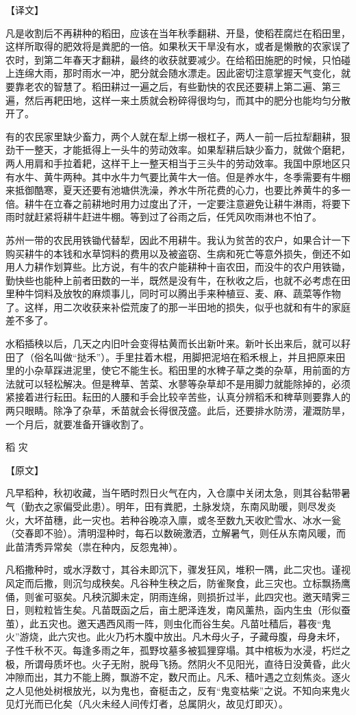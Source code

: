 \documentclass[12pt,UTF8]{ctexbook}
\begin{document}
【译文】

凡是收割后不再耕种的稻田，应该在当年秋季翻耕、开垦，使稻茬腐烂在稻田里，这样所取得的肥效将是粪肥的一倍。如果秋天干旱没有水，或者是懒散的农家误了农时，到第二年春天才翻耕，最终的收获就要减少。在给稻田施肥的时候，只怕碰上连绵大雨，那时雨水一冲，肥分就会随水漂走。因此密切注意掌握天气变化，就要靠老农的智慧了。稻田耕过一遍之后，有些勤快的农民还要耕上第二遍、第三遍，然后再耙田地，这样一来土质就会粉碎得很均匀，而其中的肥分也能均匀分散开了。

有的农民家里缺少畜力，两个人就在犁上绑一根杠子，两人一前一后拉犁翻耕，狠劲干一整天，才能抵得上一头牛的劳动效率。如果犁耕后缺少畜力，就做个磨耙，两人用肩和手拉着耙，这样干上一整天相当于三头牛的劳动效率。我国中原地区只有水牛、黄牛两种。其中水牛力气要比黄牛大一倍。但是养水牛，冬季需要有牛棚来抵御酷寒，夏天还要有池塘供洗澡，养水牛所花费的心力，也要比养黄牛的多一倍。耕牛在立春之前耕地时用力过度出了汗，一定要注意避免让耕牛淋雨，将要下雨时就赶紧将耕牛赶进牛棚。等到过了谷雨之后，任凭风吹雨淋也不怕了。

苏州一带的农民用铁锄代替犁，因此不用耕牛。我认为贫苦的农户，如果合计一下购买耕牛的本钱和水草饲料的费用以及被盗窃、生病和死亡等意外损失，倒还不如用人力耕作划算些。比方说，有牛的农户能耕种十亩农田，而没牛的农户用铁锄，勤快些也能种上前者田数的一半，既然是没有牛，在秋收之后，也就不必考虑在田里种牛饲料及放牧的麻烦事儿，同时可以腾出手来种植豆、麦、麻、蔬菜等作物了。这样，用二次收获来补偿荒废了的那一半田地的损失，似乎也就和有牛的家庭差不多了。

水稻插秧以后，几天之内旧叶会变得枯黄而长出新叶来。新叶长出来后，就可以耔田了（俗名叫做“挞禾”）。手里拄着木棍，用脚把泥培在稻禾根上，并且把原来田里的小杂草踩进泥里，使它不能生长。稻田里的水稗子草之类的杂草，用前面的方法就可以轻松解决。但是稗草、苦菜、水蓼等杂草却不是用脚力就能除掉的，必须紧接着进行耘田。耘田的人腰和手会比较辛苦些，认真分辨稻禾和稗草则要靠人的两只眼睛。除净了杂草，禾苗就会长得很茂盛。此后，还要排水防涝，灌溉防旱，一个月后，就要准备开镰收割了。

稻 灾

【原文】

凡早稻种，秋初收藏，当午晒时烈日火气在内，入仓廪中关闭太急，则其谷黏带暑气（勤衣之家偏受此患）。明年，田有粪肥，土脉发烧，东南风助暖，则尽发炎火，大坏苗穗，此一灾也。若种谷晚凉入廪，或冬至数九天收贮雪水、冰水一瓮（交春即不验）。清明湿种时，每石以数碗激洒，立解暑气，则任从东南风暖，而此苗清秀异常矣（祟在种内，反怨鬼神）。

凡稻撒种时，或水浮数寸，其谷未即沉下，骤发狂风，堆积一隅，此二灾也。谨视风定而后撒，则沉匀成秧矣。凡谷种生秧之后，防雀聚食，此三灾也。立标飘扬鹰俑，则雀可驱矣。凡秧沉脚未定，阴雨连绵，则损折过半，此四灾也。邀天晴霁三日，则粒粒皆生矣。凡苗既函之后，亩土肥泽连发，南风薰热，函内生虫（形似蚕茧），此五灾也。邀天遇西风雨一阵，则虫化而谷生矣。凡苗吐穑后，暮夜“鬼火”游烧，此六灾也。此火乃朽木腹中放出。凡木母火子，子藏母腹，母身未坏，子性千秋不灭。每逢多雨之年，孤野坟墓多被狐狸穿塌。其中棺板为水浸，朽烂之极，所谓母质坏也。火子无附，脱母飞扬。然阴火不见阳光，直待日没黄昏，此火冲隙而出，其力不能上腾，飘游不定，数尺而止。凡禾、穑叶遇之立刻焦炎。逐火之人见他处树根放光，以为鬼也，奋梃击之，反有“鬼变枯柴”之说。不知向来鬼火见灯光而已化矣（凡火未经人间传灯者，总属阴火，故见灯即灭）。
\end{document}
